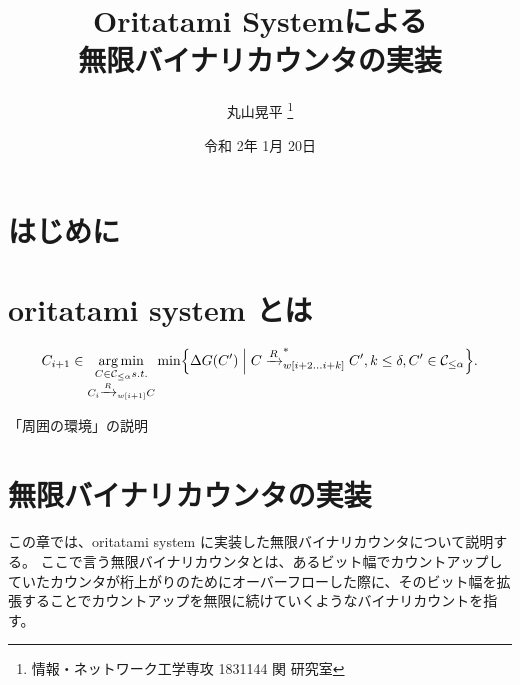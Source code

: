 \documentclass[a4j,11pt]{article}
\title{Oritatami Systemによる\\無限バイナリカウンタの実装}
\author{丸山晃平
\thanks{情報・ネットワーク工学専攻 1831144 関 研究室}
}
\date{令和 2年 1月 20日}%
\DeclareMathOperator*{\argmin}{arg\,min}
\begin{document}
\maketitle

\section{はじめに}

\section{oritatami system とは}

\begin{equation}\label{eq:OS_CF}
C_{i+1} \in \argmin_{
\substack{
C \in \mathcal{C}_{\le \alpha} s.t. \\
C_i \xrightarrow{R}_{w[i+1]}C \\
}
}
\min \Bigl\{ \Delta G(C') \Bigm|
C \xrightarrow{R}^*_{w[i+2...i+k]}C', k\le \delta, C' \in \mathcal{C}_{\le \alpha}
\Bigr\}.
\end{equation}

「周囲の環境」の説明

\section{無限バイナリカウンタの実装}
この章では、oritatami system に実装した無限バイナリカウンタについて説明する。
ここで言う無限バイナリカウンタとは、あるビット幅でカウントアップしていたカウンタが桁上がりのためにオーバーフローした際に、そのビット幅を拡張することでカウントアップを無限に続けていくようなバイナリカウントを指す。
\end{document}
